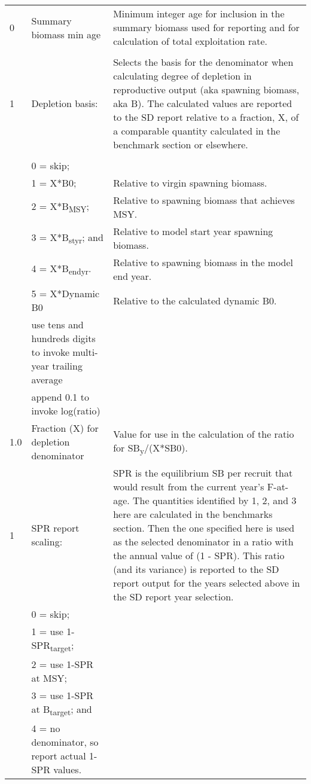 {\begin{landscape}
\begin{longtable}{p{1.5cm} p{7.2cm} p{12.3cm}}
 \hline
 0 & Summary biomass min age & \multirow{1}{1cm}[-0.25cm]{\parbox{12.5cm}{Minimum integer age for inclusion in the summary biomass used for reporting and for calculation of total exploitation rate.}} \Tstrut\\
   & & \\ 

 \hline
 1 & Depletion basis: & \multirow{1}{1cm}[-0.25cm]{\parbox{12.5cm}{Selects the basis for the denominator when calculating degree of depletion in reproductive output (aka spawning biomass, aka B). The calculated values are reported to the SD report relative to a fraction, X, of a comparable quantity calculated in the benchmark section or elsewhere.}} \Tstrut\\
   & & \Bstrut \\
   & 0 = skip; & \Tstrut \\
   & 1 = X*B0; & Relative to virgin spawning biomass. \\
   & 2 = X*B\textsubscript{MSY}; & Relative to spawning biomass that achieves MSY. \\
   & 3 = X*B\textsubscript{styr}; and & Relative to model start year spawning biomass. \\
   & 4 = X*B\textsubscript{endyr}. & Relative to spawning biomass in the model end year. \\
   & 5 = X*Dynamic B0 & Relative to the calculated dynamic B0. \\
   & use tens and hundreds digits to invoke multi-year trailing average & \\
   & append 0.1 to invoke log(ratio) & \Bstrut\\
  
 \hline
 1.0 & Fraction (X) for depletion denominator & Value for use in the calculation of the ratio for SB\textsubscript{y}/(X*SB0). \Tstrut\Bstrut\\

 \hline
 1 & SPR report scaling: & \multirow{1}{1cm}[-0.25cm]{\parbox{12.5cm}{SPR is the equilibrium SB per recruit that would result from the current year's F-at-age. The quantities identified by 1, 2, and 3 here are calculated in the benchmarks section. Then the one specified here is used as the selected denominator in a ratio with the annual value of (1 - SPR). This ratio (and its variance) is reported to the SD report output for the years selected above in the SD report year selection.}} \Tstrut\\
   & 0 = skip; & \\
   & 1 = use 1-SPR\textsubscript{target}; & \\
   & 2 = use 1-SPR at MSY; & \Tstrut\\
   & 3 = use 1-SPR at B\textsubscript{target}; and &  \Tstrut\\
   & 4 = no denominator, so report actual 1-SPR values. & \\
  

\end{longtable}
\end{landscape}}
